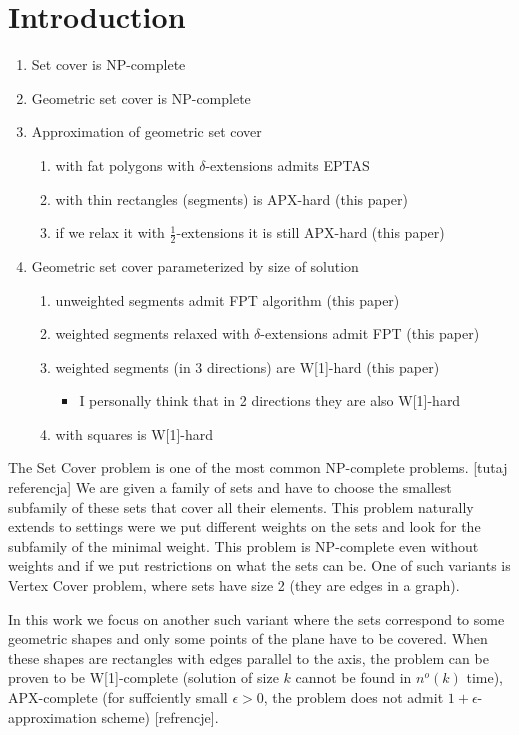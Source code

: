 \chapter{Introduction}

\begin{enumerate}
\item Set cover is NP-complete
\item Geometric set cover is NP-complete
\item Approximation of geometric set cover
	\begin{enumerate}
		\item with fat polygons with $\delta$-extensions admits EPTAS
		\item with thin rectangles (segments) is APX-hard (this paper)
		\item if we relax it with $\frac{1}{2}$-extensions it is still APX-hard (this paper)
	\end{enumerate}
\item Geometric set cover parameterized by size of solution
	\begin{enumerate}
		\item unweighted segments admit FPT algorithm (this paper)
		\item weighted segments relaxed with $\delta$-extensions admit FPT (this paper)
		\item weighted segments (in 3 directions) are W[1]-hard (this paper)
		\begin{itemize}
			\item I personally think that in 2 directions they are also W[1]-hard
		\end{itemize}
		\item with squares is W[1]-hard
	\end{enumerate}
\end{enumerate}

The Set Cover problem is one of the most common NP-complete problems.
[tutaj referencja]
We are given a family of sets and have to choose the smallest
subfamily of these sets that cover all their elements.
This problem naturally extends to settings
were we put different weights on the sets
and look for the subfamily of the minimal weight.
This problem is NP-complete even 
without weights and if we put
restrictions on what the sets can be.
One of such variants is Vertex Cover problem,
where sets have size 2 (they are edges in a graph).

In this work we focus on another such variant where the sets correspond
to some geometric shapes and
only some points of the plane have to be covered.
When these shapes are rectangles with edges parallel
to the axis, the problem can be proven to
be W[1]-complete (solution of size $k$ cannot be found
in $n^o(k)$ time),
APX-complete (for suffciently small $\epsilon > 0$, the problem
does not admit $1+\epsilon$-approximation scheme)
[refrencje].

